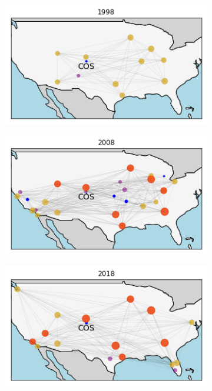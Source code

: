 \begin{figure}[H]
  \centering
  \caption{Network of Colorado Springs (COS) and its direct neighbors}
    \begin{subfigure}[t]{0.32\textwidth}
        \centering
        \includegraphics[width=\linewidth]{Exam/Figures/map_COS_98}
    \end{subfigure}
    \hfill
    \begin{subfigure}[t]{0.32\textwidth}
        \centering
        \includegraphics[width=\linewidth]{Exam/Figures/map_COS_08} 
    \end{subfigure}
    \hfill
    \begin{subfigure}[t]{0.32\textwidth}
        \centering
        \includegraphics[width=\linewidth]{Exam/Figures/map_COS_18} 
    \end{subfigure}
  \label{fig:map_COS}
\end{figure}

